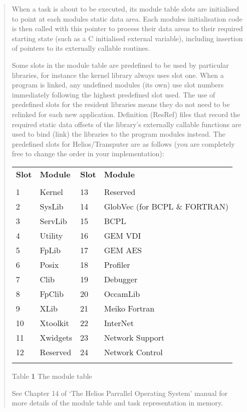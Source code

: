 \begin {quote}
When a task is about to be executed, its module table slots are initialised
to point at each modules static data area. Each modules initialisation code
is then called with this pointer to process their data areas to their required
starting state (such as a C initialised external variable),
including insertion of pointers to its externally callable routines.

Some slots in the module table are predefined to be used by particular
libraries, for instance the kernel library always uses slot one. When
a program is linked, any undefined modules (its own) use slot numbers
immediately following the highest predefined slot used. The use of
predefined slots for the resident libraries means they do not need
to be relinked for each new
application. Definition (ResRef) files that record the required
static data offsets of the library's externally callable functions are
used to bind (link) the libraries to the program modules instead.
The predefined slots for Helios/Transputer are as follows (you are completely
free to change the order in your implementation):
\scriptsize
\begin{table}[h]
\begin{center}
\begin{tabular}{llll}
\\
\bf Slot & \bf Module & \bf Slot & \bf Module\\
\\
1  & Kernel   &    13 & Reserved\\
2  & SysLib   &   14 & GlobVec (for BCPL \& FORTRAN)\\
3  & ServLib  &   15 & BCPL\\
4  & Utility  &   16 & GEM VDI\\
5  & FpLib    &   17 & GEM AES\\
6  & Posix    &   18 & Profiler\\
7  & Clib     &   19 & Debugger\\
8  & FpClib   &   20 & OccamLib\\
9  & XLib     &   21 & Meiko Fortran\\
10 & Xtoolkit &   22 & InterNet\\
11 & Xwidgets &   23 & Network Support\\
12 & Reserved &   24 & Network Control\\
\\
\end{tabular}
\end{center}
\end{table}
\normalsize                    
\begin{center}
Table {\bf 1} The module table
\end{center}
\vspace{0.25cm}
See Chapter 14 of `The Helios Parrallel Operating System' manual for more details of
the module table and task representation in memory.
\vfill
\newpage


\end{quote}
